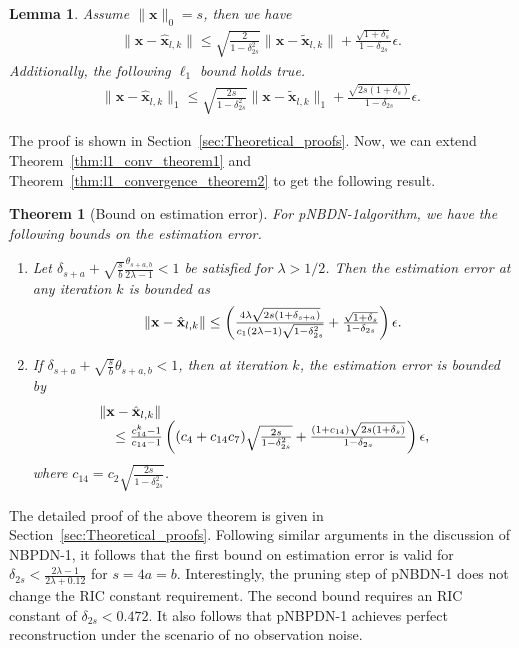 \documentclass[journal]{IEEEtran}
\newcommand{\mbx}{\mathbf{x}}
\newtheorem{theorem}{Theorem}
\newtheorem{lemma}{Lemma}
\begin{document}
\begin{lemma}
\label{lem:pruning_bound_lemma1}
Assume $\|\mbx\|_0 = s$, then we have
\begin{eqnarray*}
\|\mbx-\hat{\mbx}_{l,k}\| \leq \sqrt{\frac{2}{1-\delta_{2s}^2}}\|\mbx-\tilde{\mbx}_{l,k}\| + \frac{\sqrt{1+\delta_{s}}}{1-\delta_{2s}}\epsilon.
\end{eqnarray*}
Additionally, the following $\ell_1$ bound holds true.
\begin{eqnarray*}
\|\mbx-\hat{\mbx}_{l,k}\|_1 \leq \sqrt{\frac{2s}{1-\delta_{2s}^2}}\|\mbx-\tilde{\mbx}_{l,k}\|_1 + \frac{\sqrt{2s(1+\delta_{s})}}{1-\delta_{2s}}\epsilon.
\end{eqnarray*}
\end{lemma}
The proof is shown in Section~\ref{sec:Theoretical_proofs}. Now, we can extend Theorem~\ref{thm:l1_conv_theorem1} and Theorem~\ref{thm:l1_convergence_theorem2} to get the following result.
\begin{theorem}[Bound on estimation error]
\label{thm:l1_pruning_theorem_convergence}
For pNBDN-1algorithm, we have the following bounds on the estimation error.
\begin{enumerate}
\item Let $\delta_{s+a}+\sqrt{\frac{s}{b}}\frac{\theta_{s+a,b}}{2\lambda -1} < 1$ be satisfied for $\lambda > 1/2$. Then the estimation error at any iteration $k$ is bounded as
\begin{eqnarray*}
\begin{array}{l}
\hspace{0mm}\|\mbx-\hat{\mbx}_{l,k}\| \leq \left(\frac{4\lambda \sqrt{2s(1+\delta_{s+a})}}{c_1(2\lambda -1)\sqrt{1-\delta_{2s}^2}} + \frac{\sqrt{1+\delta_s}}{1-\delta_{2s}}\right) \epsilon.
\end{array}
\end{eqnarray*}
\item If $\delta_{s+a}+\sqrt{\frac{s}{b}}\theta_{s+a,b} < 1$, then at iteration $k$, the estimation error is bounded by
\begin{eqnarray*}
\begin{array}{l}
\hspace{-4mm}\|\mbx-\hat{\mbx}_{l,k}\| \\ \leq \frac{c_{14}^k-1}{c_{14}-1}\left((c_{4}+c_{14}c_{7}) \sqrt{\frac{2s}{1-\delta_{2s}^2}} + \frac{(1+c_{14})\sqrt{2s(1+\delta_{s})}}{1-\delta_{2s}}\right) \epsilon,
\end{array}
\end{eqnarray*}
where $c_{14} = c_2\sqrt{\frac{2s}{1-\delta_{2s}^2}}$. 
\end{enumerate}
\end{theorem}
The detailed proof of the above theorem is given in Section~\ref{sec:Theoretical_proofs}. Following similar arguments in the discussion of NBPDN-1, it follows that the first bound on estimation error is valid for $\delta_{2s} < \frac{2\lambda-1}{2\lambda+0.12}$ for $s = 4a = b$. Interestingly, the pruning step of pNBDN-1 does not change the RIC constant requirement. The second bound requires an RIC constant of $\delta_{2s} < 0.472$. It also follows that pNBPDN-1 achieves perfect reconstruction under the scenario of no observation noise.
\end{document}
